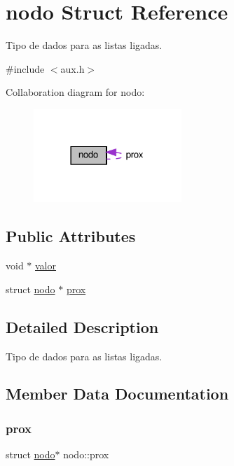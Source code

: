 \hypertarget{structnodo}{}\section{nodo Struct Reference}
\label{structnodo}


Tipo de dados para as listas ligadas.  




{\ttfamily \#include $<$aux.\+h$>$}



Collaboration diagram for nodo\+:\nopagebreak
\begin{figure}[H]
\begin{center}
\leavevmode
\includegraphics[width=158pt]{structnodo__coll__graph}
\end{center}
\end{figure}
\subsection*{Public Attributes}
\begin{DoxyCompactItemize}
\item 
void $\ast$ \hyperlink{structnodo_ab63adcdb83ea1fdcf4fa10f3cafc4a6a}{valor}
\item 
struct \hyperlink{structnodo}{nodo} $\ast$ \hyperlink{structnodo_a086547621a7da23b916bbe26e0855308}{prox}
\end{DoxyCompactItemize}


\subsection{Detailed Description}
Tipo de dados para as listas ligadas. 

\subsection{Member Data Documentation}
\mbox{\label{structnodo_a086547621a7da23b916bbe26e0855308}} 
\subsubsection{\texorpdfstring{prox}{prox}}
{\footnotesize\ttfamily struct \hyperlink{structnodo}{nodo}$\ast$ nodo\+::prox}

